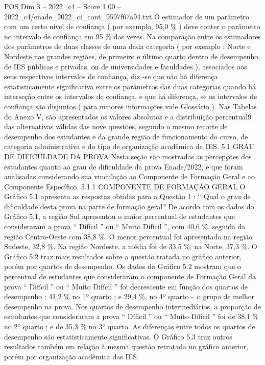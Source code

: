 \begin{textsample}{POS Dim 3 – 2022\_c4 – Score 1.00 – 2022\_c4/enade\_2022\_ci\_cont\_9597f67a94.txt}
O estimador de um parâmetro com um certo nível de confiança ( por exemplo, 95,0 \% ) deve conter o parâmetro no intervalo de confiança em 95 \% das vezes.
Na comparação entre os estimadores dos parâmetros de duas classes de uma dada categoria ( por exemplo : Norte e Nordeste nas grandes regiões, de primeiro e último quarto dentro de desempenho, de IES públicas e privadas, ou de universidades e faculdades ), associados aos seus respectivos intervalos de confiança, diz -se que não há diferença estatisticamente significativa entre os parâmetros das duas categorias quando há interseção entre os intervalos de confiança, e que há diferença, se os intervalos de confiança são disjuntos ( para maiores informações vide Glossário ).
Nas Tabelas do Anexo V, são apresentados os valores absolutos e a distribuição percentual9 das alternativas válidas das nove questões, segundo o mesmo recorte de desempenho dos estudantes e da grande região de funcionamento do curso, de categoria administrativa e do tipo de organização acadêmica da IES. 5.1 GRAU DE DIFICULDADE DA PROVA Nesta seção são mostradas as percepções dos estudantes quanto ao grau de dificuldade da prova Enade/2022, e que foram analisadas considerando sua vinculação ao Componente de Formação Geral e ao Componente Específico. 5.1.1 COMPONENTE DE FORMAÇÃO GERAL O Gráfico 5.1 apresenta as respostas obtidas para a Questão 1 : “ Qual o grau de dificuldade desta prova na parte de formação geral?
De acordo com os dados do Gráfico 5.1, a região Sul apresentou o maior percentual de estudantes que consideraram a prova “ Difícil ” ou “ Muito Difícil ”, com 40,6 \%, seguida da região Centro-Oeste com 38,8 \%.
O menor percentual foi apresentado na região Sudeste, 32,8 \%.
Na região Nordeste, a média foi de 33,5 \%, na Norte, 37,3 \%.
O Gráfico 5.2 traz mais resultados sobre a questão tratada no gráfico anterior, porém por quartos de desempenho.
Os dados do Gráfico 5.2 mostram que o percentual de estudantes que consideraram o componente de Formação Geral da prova “ Difícil ” ou “ Muito Difícil ” foi decrescente em função dos quartos de desempenho : 41,2 \% no 1º quarto ; e 29,4 \%, no 4º quarto – o grupo de melhor desempenho na prova.
Nos quartos de desempenho intermediários, a proporção de estudantes que consideraram a prova “ Díficil ” ou “ Muito Díficil ” foi de 38,1 \% no 2º quarto ; e de 35,3 \% no 3º quarto.
As diferenças entre todos os quartos de desempenho são estatisticamente significativas.
O Gráfico 5.3 traz outros resultados também em relação à mesma questão retratada no gráfico anterior, porém por organização acadêmica das IES.

\end{textsample}

